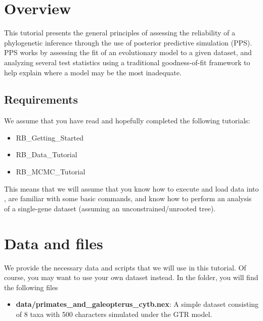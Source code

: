 \newcommand{\sur}[1]{\ensuremath{^{\textrm{#1}}}}
\newcommand{\sous}[1]{\ensuremath{_{\textrm{#1}}}}
\newenvironment{Snugshade}[1][236,236,236]{
  \definecolor{shadecolor}{RGB}{#1}%
  \begin{snugshade}%
}{%
    \end{snugshade}%
}
\section{Overview}


This tutorial presents the general principles of assessing the reliability of a phylogenetic inference through the use
of posterior predictive simulation (PPS). PPS works by assessing the fit of an evolutionary model to a given dataset,
and analyzing several test statistics using a traditional goodness-of-fit framework to help explain where a model
may be the most inadequate. 

\subsection{Requirements}
We assume that you have read and hopefully completed the following tutorials:
\begin{itemize}
\item RB\_Getting\_Started
\item RB\_Data\_Tutorial
\item RB\_MCMC\_Tutorial
\end{itemize}
This means that we will assume that you know how to execute and load data into \RevBayes, are familiar 
with some basic commands, and know how to perform an analysis of a single-gene dataset (assuming an 
unconstrained/unrooted tree).


\section{Data and files}

We provide the necessary data and scripts that we will use in this tutorial.
Of course, you may want to use your own dataset instead.
In the  folder, you will find the following files
\begin{itemize}
\item \textbf{data/primates\_and\_galeopterus\_cytb.nex}: A simple dataset consisting of 8 taxa with 500 characters simulated under the GTR model.
\end{itemize}

